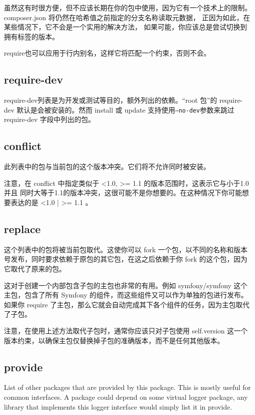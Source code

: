 虽然这有时很方便，但不应该长期在你的包中使用，因为它有一个技术上的限制。 composer.json 将仍然在哈希值之前指定的分支名称读取元数据， 正因为如此，在某些情况下，它不会是一个实用的解决方法， 如果可能，你应该总是尝试切换到拥有标签的版本。

require也可以应用于行内别名，这样它将匹配一个约束，否则不会。

\subsection{require-dev}

require-dev列表是为开发或测试等目的，额外列出的依赖。“root 包”的 require-dev 默认是会被安装的。然而 install 或 update 支持使用\texttt{--no-dev}参数来跳过 require-dev 字段中列出的包。

\subsection{conflict}

此列表中的包与当前包的这个版本冲突。它们将不允许同时被安装。

注意，在 conflict 中指定类似于 <1.0, >= 1.1 的版本范围时，这表示它与小于1.0 并且 同时大等于1.1的版本冲突，这很可能不是你想要的。在这种情况下你可能想要表达的是 <1.0 | >= 1.1 。

\subsection{replace}

这个列表中的包将被当前包取代。这使你可以 fork 一个包，以不同的名称和版本号发布，同时要求依赖于原包的其它包，在这之后依赖于你 fork 的这个包，因为它取代了原来的包。

这对于创建一个内部包含子包的主包也非常的有用。例如 symfony/symfony 这个主包，包含了所有 Symfony 的组件，而这些组件又可以作为单独的包进行发布。如果你 require 了主包，那么它就会自动完成其下各个组件的任务，因为主包取代了子包。

注意，在使用上述方法取代子包时，通常你应该只对子包使用 self.version 这一个版本约束，以确保主包仅替换掉子包的准确版本，而不是任何其他版本。

\subsection{provide}

List of other packages that are provided by this package. This is mostly useful for common interfaces. A package could depend on some virtual logger package, any library that implements this logger interface would simply list it in provide.

